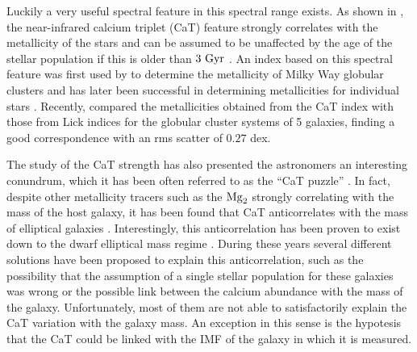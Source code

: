 	Luckily a very useful spectral feature in this spectral range exists. 
	As shown in \citet{Cenarro02}, the near-infrared calcium triplet (CaT) feature strongly correlates with the metallicity 
	of the stars and can be assumed to be unaffected by the age of the stellar population if this is 
	older than $3~\rm{Gyr}$ \citep{Vazdekis03}. 
	An index based on this spectral feature was first used by \citet{Armandroff88} to determine the metallicity of Milky Way 
	globular clusters and has later been successful in determining metallicities for individual stars \citep{Rutledge97, Battaglia08}. 
	Recently, \citet{Usher12} compared the metallicities obtained from the CaT index with those from Lick indices 
	for the globular cluster systems of 5 galaxies, finding a good correspondence with an rms scatter of $0.27$ dex. 
	
  	The study of the CaT strength has also presented the astronomers an interesting conundrum, which it has been 
  	often referred to as the ``CaT puzzle'' \citep{Michielsen07}. 
	In fact, despite other metallicity tracers such as the $\rm{Mg}_2$ strongly correlating with the mass of the 
	host galaxy, it has been found that CaT anticorrelates with the mass of elliptical galaxies 
	\citep{Saglia02, Cenarro03, FalconBarroso03}. 
	Interestingly, this anticorrelation has been proven to exist down to the dwarf elliptical mass regime 
	\citep{Michielsen03}. 
	During these years several different solutions have been proposed to explain this anticorrelation, such as 
	the possibility that the assumption of a single stellar population for these galaxies 
	was wrong \citep{Pasquali05} or the possible link between the calcium abundance with the mass of the 
	galaxy. 
	Unfortunately, most of them are not able to satisfactorily explain the CaT variation with the galaxy 
	mass. %
	An exception in this sense is the hypotesis that the CaT could be linked with the IMF of the galaxy in which 
	it is measured. 
	
	
	
